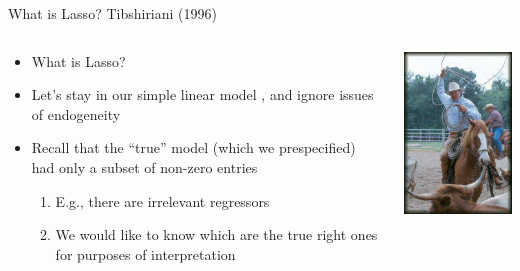       \begin{frame}[allowframebreaks]{What is Lasso? Tibshiriani (1996)}
        \begin{columns}[T] %
          \begin{column}{.7\textwidth}
            \begin{itemize}
            \item What is Lasso? 
            \item Let's stay in our simple linear model , and ignore issues of endogeneity
             \item Recall that the ``true'' model (which we prespecified) had only a subset of non-zero entries
             \begin{enumerate}[-]
              \item E.g., there are irrelevant regressors
              \item We would like to know which are the true right ones for purposes of interpretation
              \end{enumerate}
            \end{itemize}
          \end{column}%
        \hfill%
        \begin{column}{.30\textwidth}
          \includegraphics[width=\linewidth]{lasso.jpeg}
        \end{column}
      \end{columns}


\end{frame}
